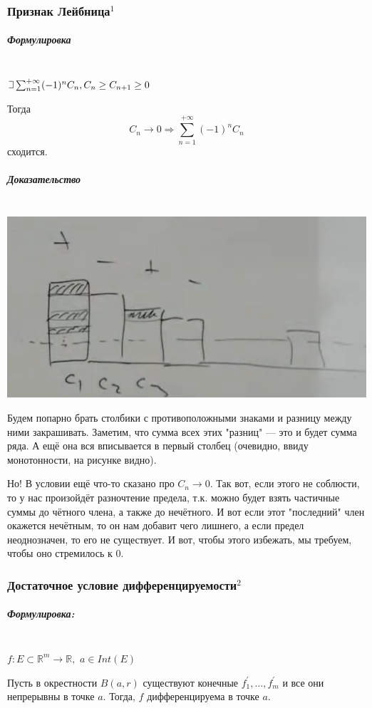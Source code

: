 \documentclass{article}
\def\letus{%
\mathord{\setbox0=\hbox{$\exists$}%
         \hbox{\kern 0.125\wd0%
               \vbox to \ht0{%
                  \hrule width 0.75\wd0%
                  \vfill%
                  \hrule width 0.75\wd0}%
               \vrule height \ht0%
               \kern 0.125\wd0}%
       }%
        }
\def\dbl{\,\,}
\let\vanillasubparagraph\subparagraph
\renewcommand{\subparagraph}[1]{\vanillasubparagraph{#1}\mbox{}\\}
\begin{document}
\subsubsection{Признак Лейбница\texorpdfstring{$^1$}{}}
\subparagraph{Формулировка}
$\letus \sum_{n=1}^{+\infty} (-1)^n C_n, C_n \ge C_{n+1} \ge 0$

Тогда
$$
C_n \rightarrow 0 \Rightarrow \sum_{n=1}^{+\infty} (-1)^n C_n
$$
сходится.

\subparagraph{Доказательство}
\includegraphics[]{../images/leibniz.png}

Будем попарно брать столбики с противоположными знаками и разницу между ними закрашивать. Заметим, что сумма всех этих "разниц" --- это и будет сумма ряда. А ещё она вся вписывается в первый столбец (очевидно, ввиду монотонности, на рисунке видно).

Но! В условии ещё что-то сказано про $C_n \rightarrow 0$. Так вот, если этого не соблюсти, то у нас произойдёт разночтение предела, т.к. можно будет взять частичные суммы до чётного члена, а также до нечётного. И вот если этот "последний" член окажется нечётным, то он нам добавит чего лишнего, а если предел неоднозначен, то его не существует. И вот, чтобы этого избежать, мы требуем, чтобы оно стремилось к $0$.


\subsubsection{Достаточное условие дифференцируемости\texorpdfstring{$^2$}{}}

\subparagraph{Формулировка: }

$f : E \subset \mathbb{R}^m \rightarrow \mathbb{R}, \dbl a \in Int(E)$

Пусть в окрестности $B(a, r)$ существуют конечные $f^\prime_1, \ldots, f^\prime_m$ и все они непрерывны в точке $a$. Тогда, $f$ дифференцируема в точке $a$.
\end{document}
